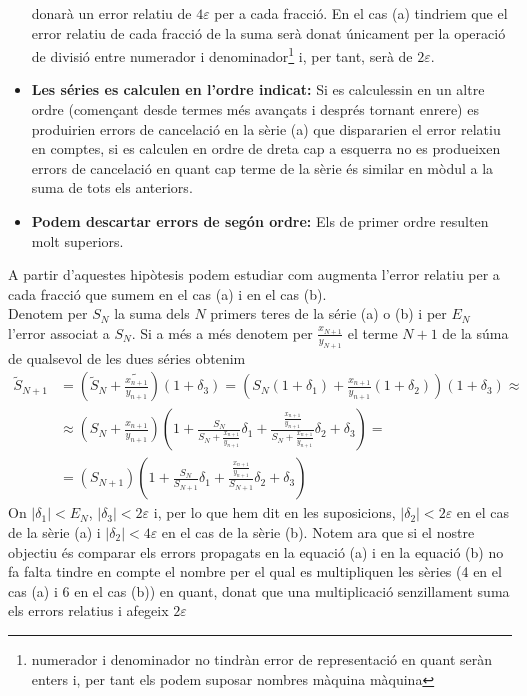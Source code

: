 \documentclass[a4paper,10pt]{article}
\renewcommand{\*}{\cdot}
\renewcommand{\epsilon}{\varepsilon}
\begin{document}
\begin{itemize}
 donarà un error relatiu de $4\epsilon$ per a cada fracció. En el cas (a) tindriem que el error relatiu de cada fracció de la suma serà donat únicament per la operació de
 divisió entre numerador i denominador\footnote{numerador i denominador no tindràn error de representació en quant seràn enters i, per tant els podem suposar nombres màquina
 màquina} i, per tant, serà de $2\epsilon$.
 \item \textbf{Les séries es calculen en l'ordre indicat:} Si es calculessin en un altre ordre (començant desde termes més avançats i després tornant enrere) es produirien
 errors de cancelació en la sèrie (a) que dispararien el error relatiu en comptes, si es calculen en ordre de dreta cap a esquerra no es produeixen errors de cancelació
 en quant cap terme de la sèrie és similar en mòdul a la suma de tots els anteriors.
 \item \textbf{Podem descartar errors de segón ordre:} Els de primer ordre resulten molt superiors.
\end{itemize}
A partir d'aquestes hipòtesis podem estudiar com augmenta l'error relatiu per a cada fracció que sumem en el cas (a) i en el cas (b).\\
Denotem per $S_N$ la suma dels $N$ primers teres de la série (a) o (b) i per $E_N$ l'error associat a $S_N$. Si a més a més denotem per $\frac{x_{N+1}}{y_{N+1}}$ el terme
$N+1$ de la súma de qualsevol de les dues séries obtenim
\begin{equation*}
\begin{split}
\tilde{S}_{N+1} &=\left(\tilde{S}_{N}+\tilde{\frac{x_{n+1}}{y_{n+1}}}\right)(1+\delta_3)=\left(S_N(1+\delta_1)+\frac{x_{n+1}}{y_{n+1}}(1+\delta_2)\right)(1+\delta_3)\approx\\
&\approx\left(S_N+\frac{x_{n+1}}{y_{n+1}}\right)\left(1+\frac{S_N}{S_N+\frac{x_{n+1}}{y_{n+1}}}\delta_1+\frac{\frac{x_{n+1}}{y_{n+1}}}{S_N+\frac{x_{n+1}}{y_{n+1}}}
\delta_2+\delta_3\right)=\\
&=(S_{N+1})\left(1+\frac{S_N}{S_{N+1}}\delta_1+\frac{\frac{x_{n+1}}{y_{n+1}}}{S_{N+1}}
\delta_2+\delta_3\right)
\end{split}
\end{equation*}
On $|\delta_1|<E_N$, $|\delta_3|<2\epsilon$ i, per lo que hem dit en les suposicions, $|\delta_2|<2\epsilon$ en el cas de la sèrie (a) i $|\delta_2|<4\epsilon$ en el cas
de la sèrie (b).
Notem ara que si el nostre objectiu és comparar els errors propagats en la equació (a) i en la equació (b) no fa falta tindre en compte el nombre per el qual es 
multipliquen les sèries (4 en el cas (a) i 6 en el cas (b)) en quant, donat que una multiplicació senzillament suma els errors relatius i afegeix $2\epsilon$
\end{document}
